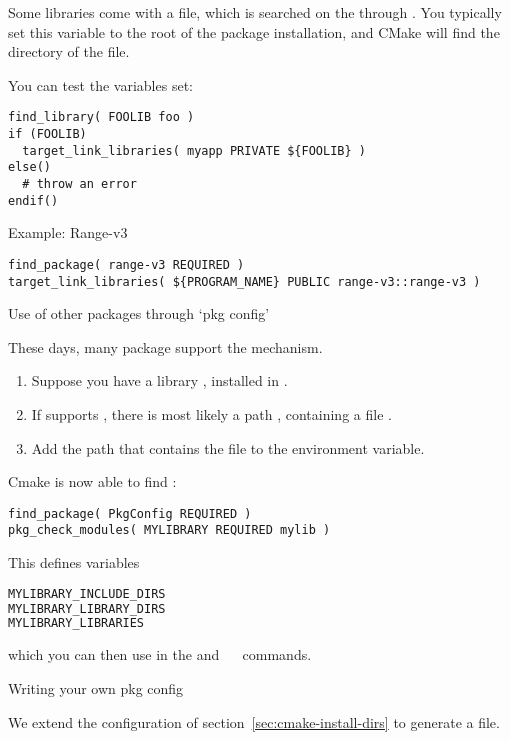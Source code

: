 Some libraries come with a  file,
which is searched on the 
through .
You typically set this variable to the root of the package installation,
and CMake will find the directory of the  file.

You can test the variables set:
\begin{lstlisting}
find_library( FOOLIB foo )
if (FOOLIB)
  target_link_libraries( myapp PRIVATE ${FOOLIB} )
else()
  # throw an error
endif()
\end{lstlisting}

 {Example: Range-v3}

\begin{lstlisting}
find_package( range-v3 REQUIRED )
target_link_libraries( ${PROGRAM_NAME} PUBLIC range-v3::range-v3 )
\end{lstlisting}

 {Use of other packages through `pkg config'}

These days, many package support the  mechanism.
\begin{enumerate}
\item Suppose you have a library , installed in .
\item If  supports , there is most likely a path
  , containing a file .
\item Add the path that contains the  file to the
   environment variable.
\end{enumerate}
Cmake is now able to find :
\begin{lstlisting}
find_package( PkgConfig REQUIRED )
pkg_check_modules( MYLIBRARY REQUIRED mylib )
\end{lstlisting}

This defines variables
\begin{lstlisting}[language=bash]
MYLIBRARY_INCLUDE_DIRS
MYLIBRARY_LIBRARY_DIRS
MYLIBRARY_LIBRARIES
\end{lstlisting}
which you can then use in the
and
~\
commands.

 {Writing your own pkg config}

We extend the configuration of section~\ref{sec:cmake-install-dirs}
to generate a \n{.pc} file.

